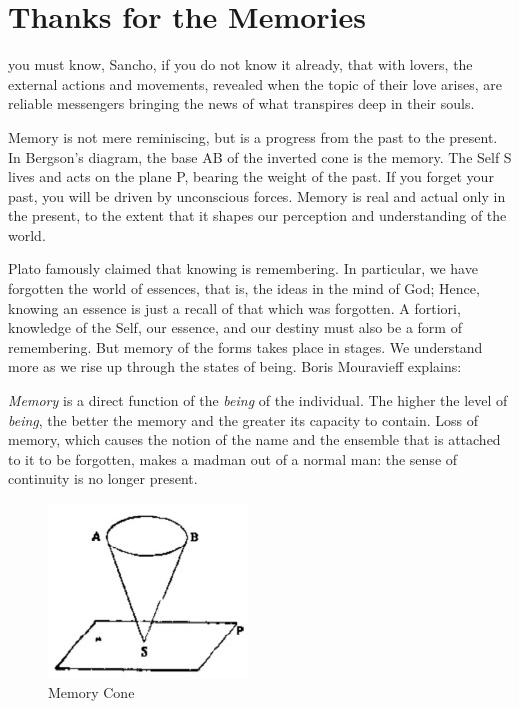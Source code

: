 \section{Thanks for the Memories}

\begin{quotex}
you must know, Sancho, if you do not know it already, that with lovers, the external actions and movements, revealed when the topic of their love arises, are reliable messengers bringing the news of what transpires deep in their souls. 

\end{quotex}
Memory is not mere reminiscing, but is a progress from the past to the present. In Bergson's diagram, the base AB of the inverted cone is the memory. The Self S lives and acts on the plane P, bearing the weight of the past. If you forget your past, you will be driven by unconscious forces. Memory is real and actual only in the present, to the extent that it shapes our perception and understanding of the world.

Plato famously claimed that knowing is remembering. In particular, we have forgotten the world of essences, that is, the ideas in the mind of God; Hence, knowing an essence is just a recall of that which was forgotten. A fortiori, knowledge of the Self, our essence, and our destiny must also be a form of remembering. But memory of the forms takes place in stages. We understand more as we rise up through the states of being. Boris Mouravieff explains:

\begin{quotex}
\emph{Memory} is a direct function of the \emph{being} of the individual. The higher the level of \emph{being}, the better the memory and the greater its capacity to contain. Loss of memory, which causes the notion of the name and the ensemble that is attached to it to be forgotten, makes a madman out of a normal man: the sense of continuity is no longer present. 

\end{quotex}

\begin{figure}
\centering
\includegraphics[scale=.5]{a20210131ThanksfortheMemories-img001.jpg} 
\caption{Memory Cone}
\end{figure}

